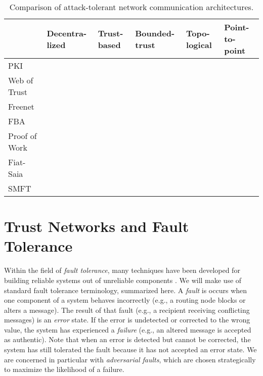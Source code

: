 \documentclass[10pt,letterpaper]{article}
\newcommand{\cmark}{\ding{51}}
\begin{document}
\begin{table*}[t!]
\caption{Comparison of attack-tolerant network communication architectures.\label{tab:compare}}
\begin{center}
\begin{tabular}{l|p{0.6in}p{0.6in}p{0.6in}p{0.6in}p{0.6in}}
                              & Decentra-lized & Trust-based & Bounded-trust & Topo-logical & Point-to-point \\
\hline
PKI            &               & \cmark      & \cmark        &             & \cmark     \\
Web of Trust   & \cmark        & \cmark      &               &             & \cmark     \\
Freenet        & \cmark        & \cmark      & \cmark        &             &            \\
FBA            & \cmark        & \cmark      & \cmark        &             & \cmark     \\
Proof of Work  & \cmark        &             & \cmark        &             &            \\
Fiat-Saia      & \cmark        & \cmark      & \cmark        & \cmark      &            \\
SMFT           & \cmark        & \cmark      & \cmark        & \cmark      & \cmark     \\
\hline
\end{tabular}
\end{center}
\end{table*}

\section*{Trust Networks and Fault Tolerance}
\label{sec-ft}

Within the field of {\em fault tolerance},
many techniques have been developed for building reliable systems
out of unreliable components
\cite{avizienis_basic_2004, von_neumann_probabilistic_1956}.
We will make use of standard fault tolerance terminology, summarized here.
A {\em fault} is occurs when one component
of a system behaves incorrectly (e.g., a routing node blocks or
alters a message).
The result of that fault (e.g., a recipient receiving conflicting messages)
is an {\em error} state.
If the error is undetected or corrected to the wrong value,
the system has experienced a {\em failure} (e.g., an altered message is
accepted as authentic).
Note that when an error is detected but cannot be corrected,
the system has still tolerated the fault because it has not accepted an error
state.
We are concerned in particular with {\em adversarial faults},
which are chosen strategically to maximize the likelihood of a failure.
\end{document}
